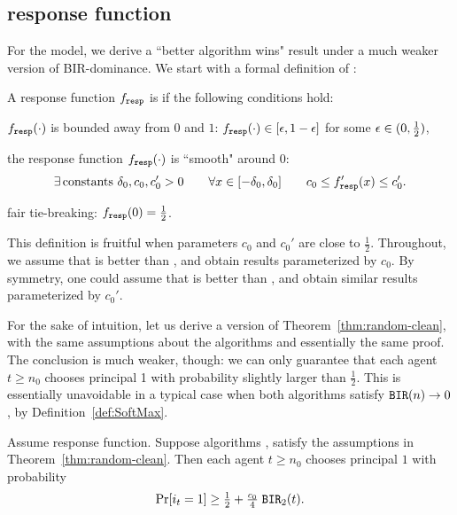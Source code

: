 \subsection{\SoftMaxRandom response function}
\label{sec:theory-SoftMax}

For the \SoftMaxRandom model, we derive a ``better algorithm wins" result under a much weaker version of BIR-dominance. We start with a formal definition of \SoftMaxRandom:

\begin{definition}\label{def:SoftMax}
A response function $f_{\mathtt{resp}}$ is \SoftMaxRandom if the following conditions hold:
\begin{OneLiners}
\item  $f_{\mathtt{resp}}(\cdot)$ is bounded away from $0$ and $1$:
    $f_{\mathtt{resp}}(\cdot)\in [\epsilon,1-\epsilon]$ for some $\epsilon\in (0,\tfrac12)$,
\item  the response function
 $f_{\mathtt{resp}}(\cdot)$ is ``smooth" around $0$:
 \begin{align}\label{eq:SoftMax-smooth}
 \exists\, \text{constants $\delta_0,c_0,c'_0>0$}
    \qquad \forall x\in [-\delta_0,\delta_0] \qquad
    c_0 \leq f_{\mathtt{resp}}'(x) \leq c'_0.
 \end{align}
\item fair tie-breaking: $f_{\mathtt{resp}}(0)=\tfrac12$.
\end{OneLiners}
\end{definition}

\begin{remark}
This definition is fruitful when parameters $c_0$ and $c_0'$ are close to $\tfrac12$. Throughout, we assume that \alg[1] is better than \alg[2], and obtain results parameterized by $c_0$. By symmetry, one could assume that \alg[2] is better than \alg[1], and obtain similar results parameterized by $c_0'$.
\end{remark}

For the sake of intuition, let us derive a version of Theorem~\ref{thm:random-clean}, with the same assumptions about the algorithms and essentially the same proof. The conclusion is much weaker, though: we can only guarantee that each agent $t\geq n_0$ chooses principal 1 with probability slightly larger than $\tfrac12$. This is essentially unavoidable in a typical case when both algorithms satisfy $\mathtt{BIR}(n)\to 0$, by Definition~\ref{def:SoftMax}.

\begin{theorem}\label{thm:SoftMax-weak}
Assume \SoftMaxRandom response function.  Suppose algorithms \alg[1], \alg[2] satisfy the assumptions in Theorem~\ref{thm:random-clean}. Then each agent
  $t\geq n_0$ chooses principal $1$ with probability
\begin{align}\label{eq:thm:SoftMax-weak}
     \Pr[i_t = 1]\geq \tfrac12 +  \tfrac{c_0}{4}\; \mathtt{BIR}_2(t).
\end{align}
\end{theorem}

